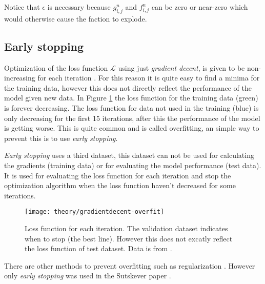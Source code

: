Notice that $\epsilon$ is necessary because $g_{i,j}^n$ and $f_{i,j}^n$ can be zero or near-zero which would otherwise cause the faction to explode.

\subsection{Early stopping}

Optimization of the loss function $\mathcal{L}$ using just \textit{gradient decent}, is given to be non-increasing for each iteration \cite{bishop}. For this reason it is quite easy to find a minima for the training data, however this does not directly reflect the performance of the model given new data. In Figure \ref{fig:theory:gradientdecent:overfit} the loss function for the training data (green) is forever decreasing. The loss function for data not used in the training (blue) is only decreasing for the first 15 iterations, after this the performance of the model is getting worse. This is quite common and is called overfitting, an simple way to prevent this is to use \textit{early stopping}.

\textit{Early stopping} uses a third dataset, this dataset can not be used for calculating the gradients (training data) or for evaluating the model performance (test data). It is used for evaluating the loss function for each iteration and stop the optimization algorithm when the loss function haven't decreased for some iterations. \cite{the-elements-of-statistical-learning, bishop, alexgraves}

\begin{figure}[h]
	\centering
	\texttt{[image: theory/gradientdecent-overfit]}
	\caption{Loss function for each iteration. The validation dataset indicates when to stop (the best line). However this does not excatly reflect the loss function of test dataset. Data is from \cite{alexgraves}.}
	\label{fig:theory:gradientdecent:overfit}
\end{figure}

There are other methods to prevent overfitting such as regularization \cite{the-elements-of-statistical-learning, bishop}. However only \textit{early stopping} was used in the Sutskever paper \cite{sutskever}.
